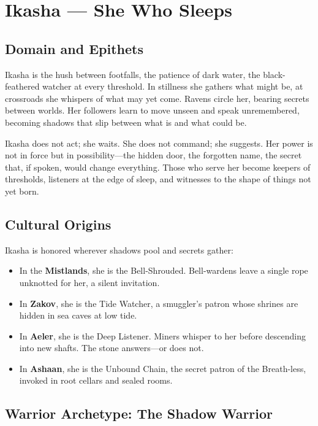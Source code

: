 \section{Ikasha — She Who Sleeps}

\subsection{Domain and Epithets}

Ikasha is the hush between footfalls, the patience of dark water, the black-feathered watcher at every threshold. In stillness she gathers what might be, at crossroads she whispers of what may yet come. Ravens circle her, bearing secrets between worlds. Her followers learn to move unseen and speak unremembered, becoming shadows that slip between what is and what could be.

Ikasha does not act; she waits. She does not command; she suggests. Her power is not in force but in possibility—the hidden door, the forgotten name, the secret that, if spoken, would change everything. Those who serve her become keepers of thresholds, listeners at the edge of sleep, and witnesses to the shape of things not yet born.

\subsection{Cultural Origins}

Ikasha is honored wherever shadows pool and secrets gather:

\begin{itemize}
\item In the \textbf{Mistlands}, she is the Bell-Shrouded. Bell-wardens leave a single rope unknotted for her, a silent invitation.
\item In \textbf{Zakov}, she is the Tide Watcher, a smuggler's patron whose shrines are hidden in sea caves at low tide.
\item In \textbf{Aeler}, she is the Deep Listener. Miners whisper to her before descending into new shafts. The stone answers—or does not.
\item In \textbf{Ashaan}, she is the Unbound Chain, the secret patron of the Breath-less, invoked in root cellars and sealed rooms.
\end{itemize}

\subsection{Warrior Archetype: The Shadow Warrior}

